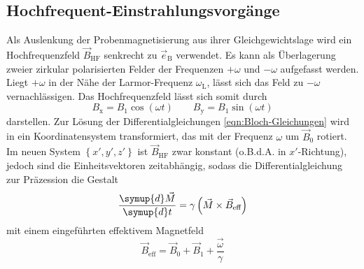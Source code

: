 \subsection{Hochfrequent-Einstrahlungsvorgänge}
\label{sec:HF-Einstrahlung}

Als Auslenkung der Probenmagnetisierung aus ihrer Gleichgewichtslage wird
ein Hochfrequenzfeld $\vec{B}_\text{HF}$ senkrecht zu $\vec{e}_\text{B}$ verwendet.
Es kann als Überlagerung zweier zirkular polarisierten Felder der
Frequenzen $+\omega$ und $-\omega$ aufgefasst werden.
Liegt $+\omega$ in der Nähe der Larmor-Frequenz $\omega_\text{L}$,
lässt sich das Feld zu $-\omega$ vernachlässigen.
Das Hochfrequenzfeld lässt sich somit durch
\begin{equation*}
  B_\text{x} = B_1 \cos\!\left(\omega t\right) \quad\quad
  B_\text{y} = B_1 \sin\!\left(\omega t\right)
\end{equation*}
darstellen.
Zur Lösung der Differentialgleichungen \eqref{eqn:Bloch-Gleichungen} wird in ein
Koordinatensystem transformiert, das mit der Frequenz $\omega$ um $\vec{B}_0$
rotiert. Im neuen System $\left\{x', y', z'\right\}$
ist $\vec{B}_\text{HF}$ zwar konstant (o.B.d.A. in $x'$-Richtung),
jedoch sind die Einheitsvektoren zeitabhängig,
sodass die Differentialgleichung zur Präzession die Gestalt
\begin{equation*}
  \frac{\symup{d} \vec{M}}{\symup{d} t} =
  \gamma \left(\vec{M} \times \vec{B}_\text{eff}\right)
\end{equation*}
mit einem eingeführten effektivem Magnetfeld
\begin{equation*}
  \vec{B}_\text{eff} = \vec{B}_0 + \vec{B}_1 + \frac{\vec{\omega}}{\gamma}
\end{equation*}
